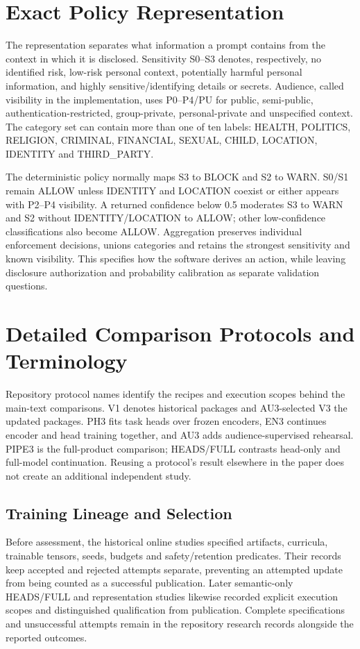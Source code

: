 \documentclass[conference]{IEEEtran}
\begin{document}
\section{Exact Policy Representation}
\label{app:policy}
The representation separates what information a prompt contains from the context in which it is disclosed. Sensitivity S0--S3 denotes, respectively, no identified risk, low-risk personal context, potentially harmful personal information, and highly sensitive/identifying details or secrets. Audience, called visibility in the implementation, uses P0--P4/PU for public, semi-public, authentication-restricted, group-private, personal-private and unspecified context. The category set can contain more than one of ten labels: HEALTH, POLITICS, RELIGION, CRIMINAL, FINANCIAL, SEXUAL, CHILD, LOCATION, IDENTITY and THIRD\_PARTY.

The deterministic policy normally maps S3 to BLOCK and S2 to WARN. S0/S1 remain ALLOW unless IDENTITY and LOCATION coexist or either appears with P2--P4 visibility. A returned confidence below 0.5 moderates S3 to WARN and S2 without IDENTITY/LOCATION to ALLOW; other low-confidence classifications also become ALLOW. Aggregation preserves individual enforcement decisions, unions categories and retains the strongest sensitivity and known visibility. This specifies how the software derives an action, while leaving disclosure authorization and probability calibration as separate validation questions.

\section{Detailed Comparison Protocols and Terminology}
\label{app:protocols}
Repository protocol names identify the recipes and execution scopes behind the main-text comparisons. V1 denotes historical packages and AU3-selected V3 the updated packages. PH3 fits task heads over frozen encoders, EN3 continues encoder and head training together, and AU3 adds audience-supervised rehearsal. PIPE3 is the full-product comparison; HEADS/FULL contrasts head-only and full-model continuation. Reusing a protocol's result elsewhere in the paper does not create an additional independent study.
\subsection{Training Lineage and Selection}
Before assessment, the historical online studies specified artifacts, curricula, trainable tensors, seeds, budgets and safety/retention predicates. Their records keep accepted and rejected attempts separate, preventing an attempted update from being counted as a successful publication. Later semantic-only HEADS/FULL and representation studies likewise recorded explicit execution scopes and distinguished qualification from publication. Complete specifications and unsuccessful attempts remain in the repository research records alongside the reported outcomes.
\end{document}

